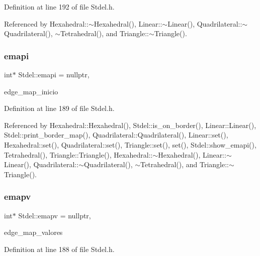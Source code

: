 Definition at line 192 of file Stdel.\+h.



Referenced by Hexahedral\+::$\sim$\+Hexahedral(), Linear\+::$\sim$\+Linear(), Quadrilateral\+::$\sim$\+Quadrilateral(), $\sim$\+Tetrahedral(), and Triangle\+::$\sim$\+Triangle().

\mbox{\label{classStdel_a9ba8eb743aeb36984b7c4ececa837e16}} 
\subsubsection{\texorpdfstring{emapi}{emapi}}
{\footnotesize\ttfamily int$\ast$ Stdel\+::emapi = nullptr\hspace{0.3cm}{\ttfamily [protected]}, {\ttfamily [inherited]}}



edge\+\_\+map\+\_\+inicio 



Definition at line 189 of file Stdel.\+h.



Referenced by Hexahedral\+::\+Hexahedral(), Stdel\+::is\+\_\+on\+\_\+border(), Linear\+::\+Linear(), Stdel\+::print\+\_\+border\+\_\+map(), Quadrilateral\+::\+Quadrilateral(), Linear\+::set(), Hexahedral\+::set(), Quadrilateral\+::set(), Triangle\+::set(), set(), Stdel\+::show\+\_\+emapi(), Tetrahedral(), Triangle\+::\+Triangle(), Hexahedral\+::$\sim$\+Hexahedral(), Linear\+::$\sim$\+Linear(), Quadrilateral\+::$\sim$\+Quadrilateral(), $\sim$\+Tetrahedral(), and Triangle\+::$\sim$\+Triangle().

\mbox{\label{classStdel_a39326d0ef108403223402c79b424a41b}} 
\subsubsection{\texorpdfstring{emapv}{emapv}}
{\footnotesize\ttfamily int$\ast$ Stdel\+::emapv = nullptr\hspace{0.3cm}{\ttfamily [protected]}, {\ttfamily [inherited]}}



edge\+\_\+map\+\_\+valores 



Definition at line 188 of file Stdel.\+h.



